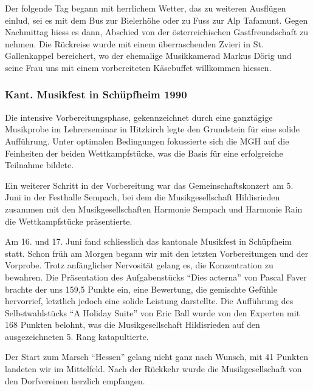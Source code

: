 \begin{history}
    Der folgende Tag begann mit herrlichem Wetter, das zu weiteren Ausflügen
    einlud, sei es mit dem Bus zur Bielerhöhe oder zu Fuss zur Alp Tafamunt.
    Gegen Nachmittag hiess es dann, Abschied von der österreichischen
    Gastfreundschaft zu nehmen. Die Rückreise wurde mit einem überraschenden
    Zvieri in St. Gallenkappel bereichert, wo der ehemalige Musikkamerad Markus
    Dörig und seine Frau uns mit einem vorbereiteten Käsebuffet willkommen
    hiessen.

    \subsubsection*{Kant. Musikfest in Schüpfheim 1990}

    Die intensive Vorbereitungsphase, gekennzeichnet durch eine ganztägige
    Musikprobe im Lehrerseminar in Hitzkirch legte den Grundstein für eine
    solide Aufführung. Unter optimalen Bedingungen fokussierte sich die MGH auf
    die Feinheiten der beiden Wettkampfstücke, was die Basis für eine
    erfolgreiche Teilnahme bildete.

    Ein weiterer Schritt in der Vorbereitung war das Gemeinschaftskonzert am 5.
    Juni in der Festhalle Sempach, bei dem die Musikgesellschaft Hildisrieden
    zusammen mit den Musikgesellschaften Harmonie Sempach und Harmonie Rain die
    Wettkampfstücke präsentierte.

    Am 16. und 17. Juni fand schliesslich das kantonale Musikfest in Schüpfheim
    statt. Schon früh am Morgen begann wir mit den letzten Vorbereitungen und
    der Vorprobe. Trotz anfänglicher Nervosität gelang es, die Konzentration zu
    bewahren. Die Präsentation des Aufgabenstücks \enquote{Dies acterna} von
    Pascal Faver brachte der uns 159,5 Punkte ein, eine Bewertung, die gemischte
    Gefühle hervorrief, letztlich jedoch eine solide Leistung darstellte. Die
    Aufführung des Selbstwahlstücks \enquote{A Holiday Suite} von Eric Ball
    wurde von den Experten mit 168 Punkten belohnt, was die Musikgesellschaft
    Hildisrieden auf den ausgezeichneten 5. Rang katapultierte.

    Der Start zum Marsch \enquote{Hessen} gelang nicht ganz nach Wunsch, mit 41
    Punkten landeten wir im Mittelfeld. Nach der Rückkehr wurde die
    Musikgesellschaft von den Dorfvereinen herzlich empfangen.

\end{history}

